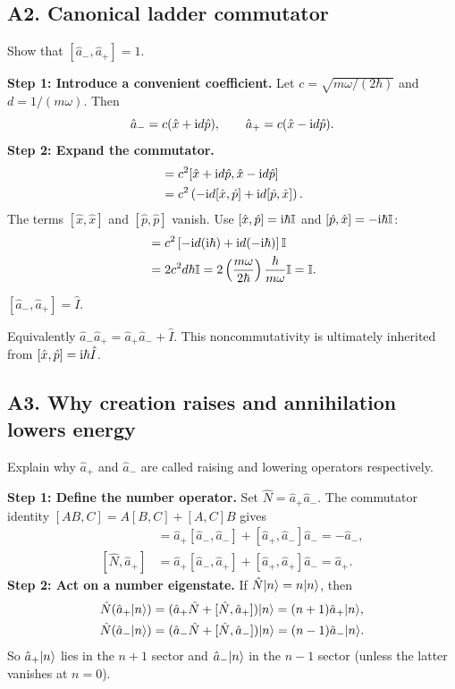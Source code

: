 \documentclass[11pt,a4paper]{article}
\newcommand{\key}[1]{\begin{resultbox}\centering\(\displaystyle #1\)\end{resultbox}}
\begin{document}
\subsection{A2. Canonical ladder commutator}
\begin{questionbox}
Show that \([\hat a_-,\hat a_+]=1\).
\end{questionbox}
\textbf{Step 1: Introduce a convenient coefficient.} Let \(c=\sqrt{m\omega/(2\hbar)}\) and \(d=1/(m\omega)\). Then
\begin{equation}\hat a_-=c(\hat x+\mathrm{i} d\hat p),\qquad \hat a_+=c(\hat x-\mathrm{i} d\hat p).\end{equation}
\textbf{Step 2: Expand the commutator.}
\begin{align}
[\hat a_-,\hat a_+]
&=c^2[\hat x+\iu d\hat p,\hat x-\iu d\hat p]\\
&=c^2\left(-\iu d[\hat x,\hat p]+\iu d[\hat p,\hat x]\right).
\end{align}
The terms \([\hat x,\hat x]\) and \([\hat p,\hat p]\) vanish. Use \([\hat x,\hat p]=\mathrm{i}\hbar\mathbb I\) and \([\hat p,\hat x]=-\mathrm{i}\hbar\mathbb I\):
\begin{align}
[\hat a_-,\hat a_+]
&=c^2\left[-\iu d(\iu\hbar)+\iu d(-\iu\hbar)\right]\id\\
&=2c^2d\hbar\id
=2\left(\frac{m\omega}{2\hbar}\right)\frac{\hbar}{m\omega}\id=\id.
\end{align}
\key{\boxed{[\hat a_-,\hat a_+]=\hat I.}}
Equivalently \(\hat a_-\hat a_+=\hat a_+\hat a_-+\hat I\). This noncommutativity is ultimately inherited from \([\hat x,\hat p]=\mathrm{i}\hbar\hat I\).

\subsection{A3. Why creation raises and annihilation lowers energy}
\begin{questionbox}
Explain why \(\hat a_+\) and \(\hat a_-\) are called raising and lowering operators respectively.
\end{questionbox}
\textbf{Step 1: Define the number operator.} Set \(\hat N=\hat a_+\hat a_-\). The commutator identity \([AB,C]=A[B,C]+[A,C]B\) gives
\begin{align}
[\hat N,\hat a_-]&=\hat a_+[\hat a_-,\hat a_-]+[\hat a_+,\hat a_-]\hat a_-=-\hat a_-,\\
[\hat N,\hat a_+]&=\hat a_+[\hat a_-,\hat a_+]+[\hat a_+,\hat a_+]\hat a_-=\hat a_+.
\end{align}
\textbf{Step 2: Act on a number eigenstate.} If \(\hat N|n\rangle=n|n\rangle\), then
\begin{align}
\hat N(\hat a_+|n\rangle)&=(\hat a_+\hat N+[\hat N,\hat a_+])|n\rangle=(n+1)\hat a_+|n\rangle,\\
\hat N(\hat a_-|n\rangle)&=(\hat a_-\hat N+[\hat N,\hat a_-])|n\rangle=(n-1)\hat a_-|n\rangle.
\end{align}
So \(\hat a_+|n\rangle\) lies in the \(n+1\) sector and \(\hat a_-|n\rangle\) in the \(n-1\) sector (unless the latter vanishes at \(n=0\)).
\end{document}
